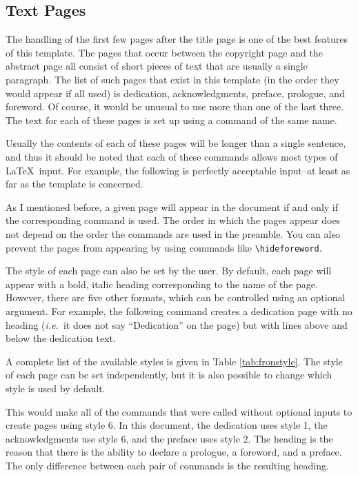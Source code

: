 \subsection{Text Pages}  \label{ssec:dedication}
The handling of the first few pages after the title page is one of the
best features of this template.  The pages that occur between the
copyright page and the abstract page all consist of short pieces of text
that are usually a single paragraph.  The list of such pages that exist
in this template (in the order they would appear if all used) is
dedication, acknowledgments, preface, prologue, and foreword.  Of
course, it would be unusual to use more than one of the last three.
The text for each of these pages is set up using a command of the same
name.
\begin{code}
\end{code}
Usually the contents of each of these pages will be longer than a single
sentence, and thus it should be noted that each of these commands allows
most types of \LaTeX~input.  For example, the following is perfectly
acceptable input--at least as far as the template is concerned.
\begin{code}
\end{code}

As I mentioned before, a given page will appear in the document if and
only if the corresponding command is used.  The order in which the pages
appear does not depend on the order the commands are used in the
preamble.  You can also prevent the pages from appearing by using
commands like \verb|\hideforeword|.

The style of each page can also be set by the user.  By default, each
page will appear with a bold, italic heading corresponding to the name
of the page.  However, there are five other formats, which can be
controlled using an optional argument.  For example, the following
command creates a dedication page with no heading (\textit{i.e.}~it
does not say ``Dedication'' on the page) but with lines above and
below the dedication text.
\begin{code}
\dedication[4]{To Mom}
\end{code}
A complete list of the available styles is given in Table
\ref{tab:fronstyle}.  The style of each page can be set independently,
but it is also possible to change which style is used by default.
\begin{code}
\end{code}
This would make all of the commands that were called without optional
inputs to create pages using style 6.  In this document, the dedication
uses style 1, the acknowledgments use style 6, and the preface uses
style 2.  The heading is the reason that there is the ability to declare
a prologue, a foreword, and a preface.  The only difference between each
pair of commands is the resulting heading.

